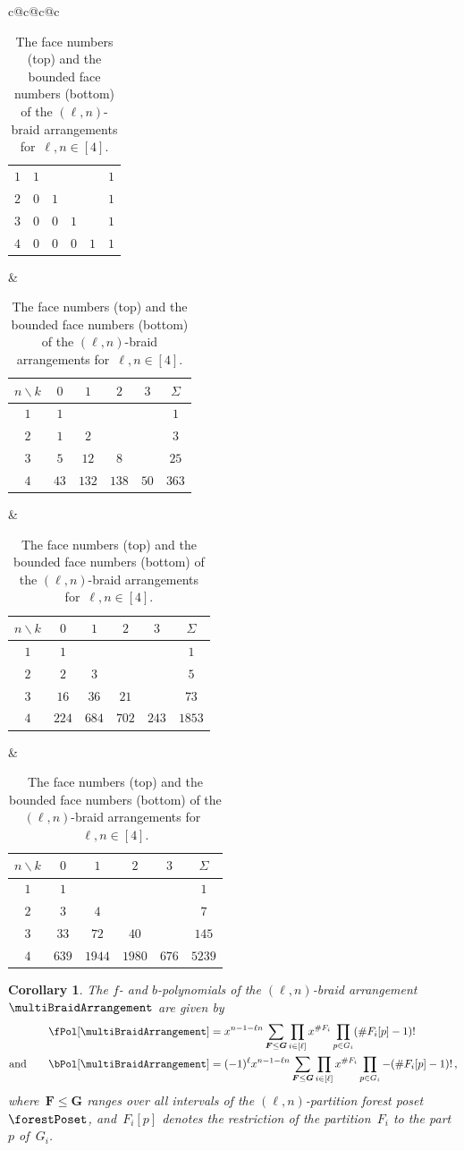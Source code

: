 \documentclass{amsart}
\newtheorem{corollary}[theorem]{Corollary}
\theoremstyle{definition}
\renewcommand{\b}[1]{{\boldsymbol{#1}}} %
\renewcommand{\b}[1]{\boldsymbol{#1}} %
\begin{document}
\begin{table}[b]
{{\begin{tabular}{c@{\hspace{.7cm}}c@{\hspace{.7cm}}c@{\hspace{.7cm}}c}
\begin{tabular}[t]{c|cccc|c}
				\hline
				$1$ & $1$ &&&& $1$ \\
				$2$ & $0$ & $1$ &&& $1$ \\
				$3$ & $0$ & $0$ & $1$ && $1$ \\
				$4$ & $0$ & $0$ & $0$ & $1$ & $1$
			\end{tabular}
			&
			\begin{tabular}[t]{c|cccc|c}
				$n \backslash k$ & $0$ & $1$ & $2$ & $3$ & $\Sigma$ \\
				\hline
				$1$ & $1$ &&&& $1$ \\
				$2$ & $1$ & $2$ &&& $3$ \\
				$3$ & $5$ & $12$ & $8$ && $25$ \\
				$4$ & $43$ & $132$ & $138$ & $50$ & $363$
			\end{tabular}
			&
			\begin{tabular}[t]{c|cccc|c}
				$n \backslash k$ & $0$ & $1$ & $2$ & $3$ & $\Sigma$ \\
				\hline
				$1$ & $1$ &&&& $1$ \\
				$2$ & $2$ & $3$ &&& $5$ \\
				$3$ & $16$ & $36$ & $21$ && $73$ \\
				$4$ & $224$ & $684$ & $702$ & $243$ & $1853$
			\end{tabular}
			&
			\begin{tabular}[t]{c|cccc|c}
				$n \backslash k$ & $0$ & $1$ & $2$ & $3$ & $\Sigma$ \\
				\hline
				$1$ & $1$ &&&& $1$ \\
				$2$ & $3$ & $4$ &&& $7$ \\
				$3$ & $33$ & $72$ & $40$ && $145$ \\
				$4$ & $639$ & $1944$ & $1980$ & $676$ & $5239$
			\end{tabular}
		\end{tabular}
	}}
	\caption{The face numbers (top) and the bounded face numbers (bottom) of the $(\ell,n)$-braid arrangements for~$\ell, n \in [4]$.}
	\label{table:fvectorMultiBraidArrangements}
\end{table}

\begin{corollary}
\label{coro:fbvectorsMultiBraidArrangement}
The $f$- and $b$-polynomials of the $(\ell,n)$-braid arrangement~$\multiBraidArrangement$ are given by
\begin{align*}
\fPol[\multiBraidArrangement] & = x^{n-1-\ell n}\sum_{\b{F} \le \b{G}} \prod_{i \in [\ell]} x^{\#F_i} \prod_{p \in G_i} (\# F_i[p]-1)!\\
\text{and}\qquad
\bPol[\multiBraidArrangement] & = (-1)^\ell x^{n-1-\ell n} \sum_{\b{F} \le \b{G}} \prod_{i \in [\ell]} x^{\#F_i} \prod_{p \in G_i} -(\# F_i[p]-1)! \, ,
\end{align*}
where~$\b{F} \le \b{G}$ ranges over all intervals of the $(\ell,n)$-partition forest poset~$\forestPoset$, and~$F_i[p]$ denotes the restriction of the partition~$F_i$ to the part~$p$ of~$G_i$.
\end{corollary}
\end{document}
